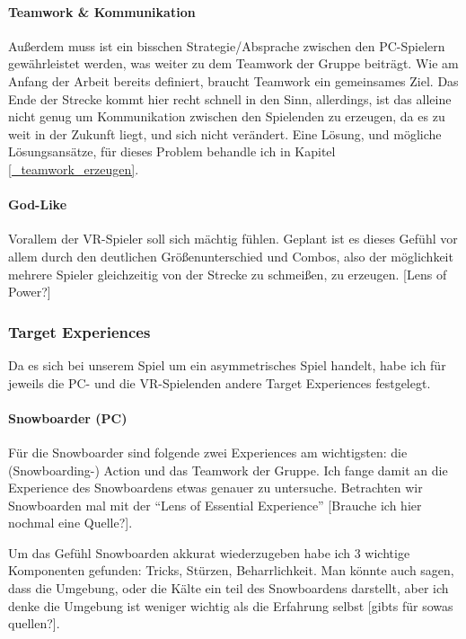 \paragraph{Teamwork \& Kommunikation}
Außerdem muss ist ein bisschen Strategie/Absprache zwischen den PC-Spielern gewährleistet werden, was weiter zu dem Teamwork der Gruppe beiträgt. Wie am Anfang der Arbeit bereits definiert, braucht Teamwork ein gemeinsames Ziel. Das Ende der Strecke kommt hier recht schnell in den Sinn, allerdings, ist das alleine nicht genug um Kommunikation zwischen den Spielenden zu erzeugen, da es zu weit in der Zukunft liegt, und sich nicht verändert. Eine Lösung, und mögliche Lösungsansätze, für dieses Problem behandle ich in Kapitel \ref{_teamwork_erzeugen}.

\paragraph{God-Like}
Vorallem der VR-Spieler soll sich mächtig fühlen. Geplant ist es dieses Gefühl vor allem durch den deutlichen Größenunterschied und Combos, also der möglichkeit mehrere Spieler gleichzeitig von der Strecke zu schmeißen, zu erzeugen.
[Lens of Power?]

\subsubsection{Target Experiences}

Da es sich bei unserem Spiel um ein asymmetrisches Spiel handelt, habe ich für jeweils die PC- und die VR-Spielenden andere Target Experiences festgelegt.

\paragraph{Snowboarder (PC)}
Für die Snowboarder sind folgende zwei Experiences am wichtigsten: die (Snowboarding-) Action und das Teamwork der Gruppe. Ich fange damit an die Experience des Snowboardens etwas genauer zu untersuche. Betrachten wir Snowboarden mal mit der "`Lens of Essential Experience"' [Brauche ich hier nochmal eine Quelle?].

Um das Gefühl Snowboarden akkurat wiederzugeben habe ich 3 wichtige Komponenten gefunden: Tricks, Stürzen, Beharrlichkeit. Man könnte auch sagen, dass die Umgebung, oder die Kälte ein teil des Snowboardens darstellt, aber ich denke die Umgebung ist weniger wichtig als die Erfahrung selbst [gibts für sowas quellen?]. 

